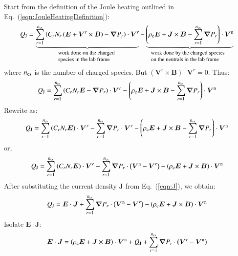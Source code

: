 \documentclass{warpdoc}
\newcommand{\ncs}{{n_{\rm cs}}}
\renewcommand{\vec}[1]{\bm{#1}}
\begin{document}
Start from the definition of the Joule heating outlined in Eq.\ (\ref{eqn:JouleHeatingDefinition}):
%
\begin{equation}
 Q_{\rm J} = \underbrace{  \sum_{r=1}^\ncs \left( C_r N_r \left( \vec{E}+\vec{V}^r \times\vec{B}\right)  - \vec{\nabla} P_r \right)\cdot \vec{V}^r}_{\textrm{\begin{minipage}{3cm}\flushleft \footnotesize work done on the charged species in the lab frame\end{minipage}}} 
- \underbrace{\left(\rho_{\rm c} \vec{E} + \vec{J}\times\vec{B} -\sum_{r=1}^\ncs \vec{\nabla} P_r \right)\cdot \vec{V}^{\rm n}}_{\textrm{\begin{minipage}{4cm}\flushleft \footnotesize work done by the charged species on the neutrals in the lab frame\end{minipage}}}
\end{equation}
%
where $n_{\rm cs}$ is the number of charged species. But $(\vec{V}^r \times\vec{B})\cdot \vec{V}^r=0$. Thus:
%
\begin{equation}
 Q_{\rm J} =   \sum_{r=1}^\ncs \left( C_r N_r  \vec{E}  - \vec{\nabla} P_r \right)\cdot \vec{V}^r 
- \left(\rho_{\rm c} \vec{E} + \vec{J}\times\vec{B} -\sum_{r=1}^\ncs \vec{\nabla} P_r \right)\cdot \vec{V}^{\rm n}
\end{equation}
%
Rewrite as:
%
\begin{equation}
 Q_{\rm J} =   \sum_{r=1}^\ncs \left( C_r N_r  \vec{E}   \right)\cdot \vec{V}^r 
-  \sum_{r=1}^\ncs \vec{\nabla} P_r \cdot \vec{V}^r 
- \left(\rho_{\rm c} \vec{E} + \vec{J}\times\vec{B} -\sum_{r=1}^\ncs \vec{\nabla} P_r \right)\cdot \vec{V}^{\rm n}
\end{equation}
%
or,
%
\begin{equation}
 Q_{\rm J} =   \sum_{r=1}^\ncs \left( C_r N_r  \vec{E}   \right)\cdot \vec{V}^r 
+  \sum_{r=1}^\ncs \vec{\nabla} P_r \cdot \left(\vec{V}^{\rm n}-\vec{V}^r\right) 
- \left(\rho_{\rm c} \vec{E} + \vec{J}\times\vec{B} \right)\cdot \vec{V}^{\rm n}
\end{equation}
%
After substituting the current density $\vec{J}$ from Eq.\ (\ref{eqn:J}), we obtain: 
%
\begin{equation}
 Q_{\rm J} =     \vec{E} \cdot \vec{J} 
+  \sum_{r=1}^\ncs \vec{\nabla} P_r \cdot \left(\vec{V}^{\rm n}-\vec{V}^r\right) 
- \left(\rho_{\rm c} \vec{E} + \vec{J}\times\vec{B} \right)\cdot \vec{V}^{\rm n}
\end{equation}
%
Isolate $\vec{E}\cdot\vec{J}$:
%
\begin{equation}
\vec{E} \cdot \vec{J}
=
 \left(\rho_{\rm c} \vec{E} + \vec{J}\times\vec{B} \right)\cdot \vec{V}^{\rm n}
+ Q_{\rm J} 
+  \sum_{r=1}^\ncs \vec{\nabla} P_r \cdot \left(\vec{V}^r-\vec{V}^{\rm n}\right) 
\end{equation}
\end{document}
